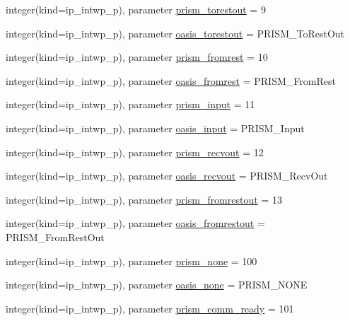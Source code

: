 \begin{DoxyCompactItemize}
\item 
integer(kind=ip\+\_\+intwp\+\_\+p), parameter \hyperlink{classmod__oasis__parameters_a9ed7a0f0a9392248de5b4b15849843df}{prism\+\_\+torestout} = 9
\item 
integer(kind=ip\+\_\+intwp\+\_\+p), parameter \hyperlink{classmod__oasis__parameters_a390018877602efede436bd0721add299}{oasis\+\_\+torestout} = P\+R\+I\+S\+M\+\_\+\+To\+Rest\+Out
\item 
integer(kind=ip\+\_\+intwp\+\_\+p), parameter \hyperlink{classmod__oasis__parameters_ad77e6f35280cf4e306f818f9ec815441}{prism\+\_\+fromrest} = 10
\item 
integer(kind=ip\+\_\+intwp\+\_\+p), parameter \hyperlink{classmod__oasis__parameters_aa0584909970d34364b7ec319292b1682}{oasis\+\_\+fromrest} = P\+R\+I\+S\+M\+\_\+\+From\+Rest
\item 
integer(kind=ip\+\_\+intwp\+\_\+p), parameter \hyperlink{classmod__oasis__parameters_aa9009f13473f2cb6476c2fb5e4963243}{prism\+\_\+input} = 11
\item 
integer(kind=ip\+\_\+intwp\+\_\+p), parameter \hyperlink{classmod__oasis__parameters_ae65ca856d776de249fc624b2d76bc4e8}{oasis\+\_\+input} = P\+R\+I\+S\+M\+\_\+\+Input
\item 
integer(kind=ip\+\_\+intwp\+\_\+p), parameter \hyperlink{classmod__oasis__parameters_ab56f2573ea7fd626f24e42606f4745a2}{prism\+\_\+recvout} = 12
\item 
integer(kind=ip\+\_\+intwp\+\_\+p), parameter \hyperlink{classmod__oasis__parameters_ac7406e7f558491599acfbb6f4628f811}{oasis\+\_\+recvout} = P\+R\+I\+S\+M\+\_\+\+Recv\+Out
\item 
integer(kind=ip\+\_\+intwp\+\_\+p), parameter \hyperlink{classmod__oasis__parameters_ac989a8af875dd1765b1369814fd4eb9d}{prism\+\_\+fromrestout} = 13
\item 
integer(kind=ip\+\_\+intwp\+\_\+p), parameter \hyperlink{classmod__oasis__parameters_a76a87a170e0c08863ae981693eb88fb8}{oasis\+\_\+fromrestout} = P\+R\+I\+S\+M\+\_\+\+From\+Rest\+Out
\item 
integer(kind=ip\+\_\+intwp\+\_\+p), parameter \hyperlink{classmod__oasis__parameters_a81e4e20be511cd8be2ab3881b42f8f3e}{prism\+\_\+none} = 100
\item 
integer(kind=ip\+\_\+intwp\+\_\+p), parameter \hyperlink{classmod__oasis__parameters_a368402af56fd08ed95ad88d0c987733a}{oasis\+\_\+none} = P\+R\+I\+S\+M\+\_\+\+N\+O\+N\+E
\item 
integer(kind=ip\+\_\+intwp\+\_\+p), parameter \hyperlink{classmod__oasis__parameters_a953f0a4738f9ca919cf5e446998cc79e}{prism\+\_\+comm\+\_\+ready} = 101

\end{DoxyCompactItemize}
